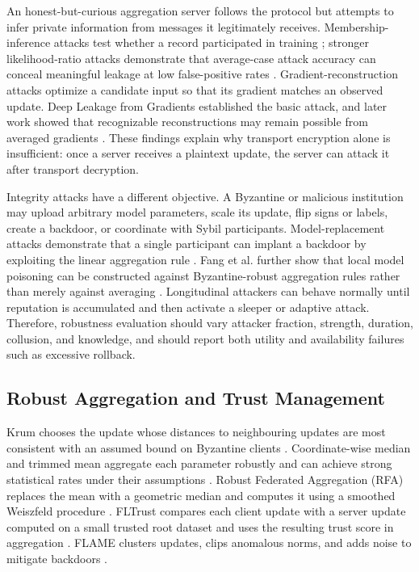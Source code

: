 An honest-but-curious aggregation server follows the protocol but attempts to infer private information from messages it legitimately receives. Membership-inference attacks test whether a record participated in training \cite{shokri2017membership}; stronger likelihood-ratio attacks demonstrate that average-case attack accuracy can conceal meaningful leakage at low false-positive rates \cite{carlini2022membership}. Gradient-reconstruction attacks optimize a candidate input so that its gradient matches an observed update. Deep Leakage from Gradients established the basic attack, and later work showed that recognizable reconstructions may remain possible from averaged gradients \cite{zhu2019dlg,geiping2020inverting}. These findings explain why transport encryption alone is insufficient: once a server receives a plaintext update, the server can attack it after transport decryption.

Integrity attacks have a different objective. A Byzantine or malicious institution may upload arbitrary model parameters, scale its update, flip signs or labels, create a backdoor, or coordinate with Sybil participants. Model-replacement attacks demonstrate that a single participant can implant a backdoor by exploiting the linear aggregation rule \cite{bagdasaryan2020backdoor}. Fang et al. further show that local model poisoning can be constructed against Byzantine-robust aggregation rules rather than merely against averaging \cite{fang2020local}. Longitudinal attackers can behave normally until reputation is accumulated and then activate a sleeper or adaptive attack. Therefore, robustness evaluation should vary attacker fraction, strength, duration, collusion, and knowledge, and should report both utility and availability failures such as excessive rollback.

\subsection{Robust Aggregation and Trust Management}

Krum chooses the update whose distances to neighbouring updates are most consistent with an assumed bound on Byzantine clients \cite{blanchard2017krum}. Coordinate-wise median and trimmed mean aggregate each parameter robustly and can achieve strong statistical rates under their assumptions \cite{yin2018byzantine}. Robust Federated Aggregation (RFA) replaces the mean with a geometric median and computes it using a smoothed Weiszfeld procedure \cite{pillutla2022robust}. FLTrust compares each client update with a server update computed on a small trusted root dataset and uses the resulting trust score in aggregation \cite{cao2021fltrust}. FLAME clusters updates, clips anomalous norms, and adds noise to mitigate backdoors \cite{nguyen2022flame}.

